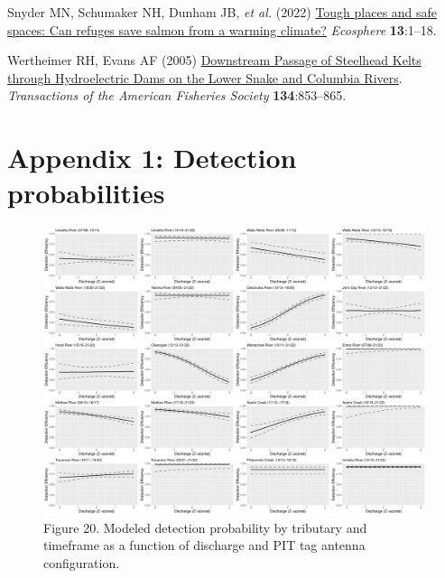 \documentclass[
  12pt,
]{report}
\newlength{\cslhangindent}
\newlength{\cslentryspacingunit} %
\newenvironment{CSLReferences}[2] %
 {%
  \setlength{\parindent}{0pt}
  \ifodd #1
  \let\oldpar\par
  \def\par{\hangindent=\cslhangindent\oldpar}
  \fi
  \setlength{\parskip}{#2\cslentryspacingunit}
 }%
 {}
\begin{document}
\begin{CSLReferences}{1}{0}
\leavevmode{}%
Snyder MN, Schumaker NH, Dunham JB, \emph{et al.} (2022)
\href{https://doi.org/10.1002/ecs2.4265}{{Tough places and safe spaces:
Can refuges save salmon from a warming climate?}} \emph{Ecosphere}
\textbf{13}:1--18.

\leavevmode{}%
Wertheimer RH, Evans AF (2005)
\href{https://doi.org/10.1577/t04-219.1}{{Downstream Passage of
Steelhead Kelts through Hydroelectric Dams on the Lower Snake and
Columbia Rivers}}. \emph{Transactions of the American Fisheries Society}
\textbf{134}:853--865.

\end{CSLReferences}

\hypertarget{appendix-1-detection-probabilities}{%
\chapter{Appendix 1: Detection
probabilities}\label{appendix-1-detection-probabilities}}

\begin{figure}
\centering
\includegraphics[width=1\textwidth,height=\textheight]{.//figures/DE_plots.pdf}
\caption{Figure 20. Modeled detection probability by tributary and
timeframe as a function of discharge and PIT tag antenna configuration.}
\end{figure}
\end{document}
